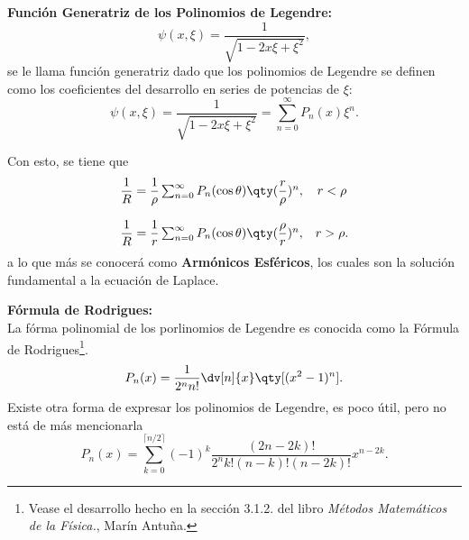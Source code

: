 \begin{mdframed}[style=warning]
	{\Large \textbf{Función Generatriz de los Polinomios de Legendre:}} \\
		$$ \psi (x,\xi) = \frac{1}{\sqrt{1 - 2x\xi + \xi ^2}}, $$
	se le llama función generatriz dado que los polinomios de Legendre se definen como los coeficientes del desarrollo en series de potencias de $\xi$:
		\begin{equation}
			\psi (x,\xi) = \frac{1}{\sqrt{1 - 2x\xi + \xi ^2}} = \sum _{n = 0} ^\infty P_n (x) \xi ^n . \label{generatriz}
		\end{equation}
\end{mdframed}


Con esto, se tiene que
	$$
		\left.\begin{array}{cc}
			\dfrac{1}{R} = \dfrac{1}{\rho} \sum _{n = 0} ^\infty P_n (\cos{\theta}) \qty(\dfrac{r}{\rho})^n , & r < \rho \\
			 & \\
			\dfrac{1}{R} = \dfrac{1}{r} \sum _{n = 0} ^\infty P_n (\cos{\theta}) \qty(\dfrac{\rho}{r})^n, & r > \rho .
		\end{array}\right.
	$$
a lo que más se conocerá como \textbf{Armónicos Esféricos}, los cuales son la solución fundamental a la ecuación de Laplace.



\begin{mdframed}[style=warning]
	{\Large \textbf{Fórmula de Rodrigues:}} \\
	La fórma polinomial de los porlinomios de Legendre es conocida como la Fórmula de Rodrigues\footnote{Vease el desarrollo hecho en la sección 3.1.2. del libro \textit{Métodos Matemáticos de la Física.}, Marín Antuña.}.
		$$ P_n (x) = \frac{1}{2^n n!} \dv[n]{x} \qty[(x^2 - 1)^n]. $$
	Existe otra forma de expresar los polinomios de Legendre, es poco útil, pero no está de más mencionarla
		$$ P_n (x) = \sum _{k = 0} ^{\lceil n/2 \rceil} (-1)^k \frac{(2n - 2k)!}{2^n k! (n - k)! (n - 2k)!} x^{n - 2k}. $$
\end{mdframed}




